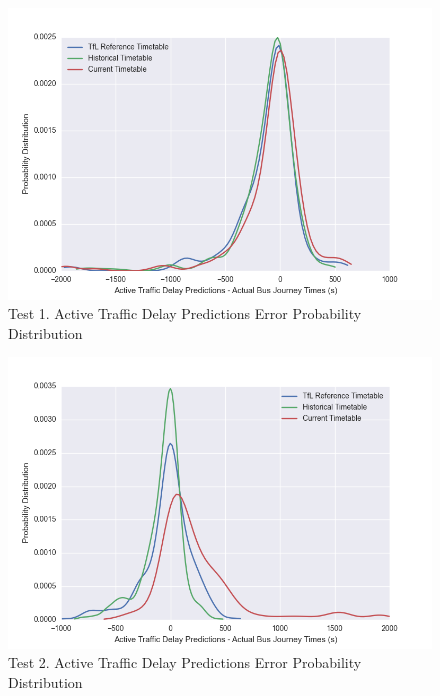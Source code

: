 \begin{figure}
\centering
\includegraphics[width=\textwidth]{figures/prediction_accuracy_16.png}
\caption{\label{fig:prediction_accuracy_16} Test 1. Active Traffic Delay Predictions Error Probability Distribution}
\end{figure}

\begin{figure}
\centering
\includegraphics[width=\textwidth]{figures/prediction_accuracy_19.png}
\caption{\label{fig:prediction_accuracy_19} Test 2. Active Traffic Delay Predictions Error Probability Distribution}
\end{figure}

